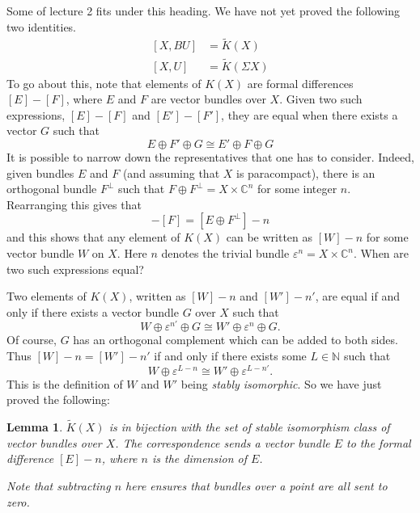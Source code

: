 \documentclass[a4paper,10pt]{article}
\theoremstyle{plain}%
\newtheorem{lem}[thm]{Lemma}
\theoremstyle{definition}
\theoremstyle{remark}
\newcommand{\NN}{\mathbb{N}}
\newcommand{\CC}{\mathbb{C}}
\renewcommand{\epsilon}{\varepsilon}
\newcommand{\eps}{\epsilon}
\begin{document}
Some of lecture 2 fits under this heading.
We have not yet proved the following two identities.
\begin{align}
  \label{xbu-is-kx} [X, BU] &= \tilde{K}(X)\\
  \label{xu-is-ksx}[X, U] &= \tilde{K}(\Sigma X)
\end{align}
To go about this, note that elements of $K(X)$ are formal differences
$[E]-[F]$, where $E$ and $F$ are vector bundles over $X$. Given two
such expressions, $[E]-[F]$ and $[E']-[F']$, they are equal when there
exists a vector $G$ such that
\begin{equation*}
  E\oplus F' \oplus G \cong E' \oplus F \oplus G
\end{equation*}
It is possible to narrow down the representatives that one has to
consider. Indeed, given bundles $E$ and $F$ (and assuming that $X$ is
paracompact), there is an orthogonal bundle $F^\perp$ such that
$F\oplus F^\perp = X \times \CC^n$ for some integer $n$. Rearranging
this gives that
\begin{equation*}
  [E]-[F] = [E\oplus F^\perp] - n
\end{equation*}
and this shows that any element of $K(X)$ can be written as $[W]-n$
for some vector bundle $W$ on $X$. Here $n$ denotes the trivial bundle
$\eps^n = X\times \CC^n$. When are two such expressions equal?

Two elements of $K(X)$, written as $[W]-n$ and $[W']-n'$, are equal if
and only if there exists a vector bundle $G$ over $X$ such that
\begin{equation*}
  W \oplus \eps^{n'} \oplus G \cong W' \oplus \eps^n \oplus G.
\end{equation*}
Of course, $G$ has an orthogonal complement which can be added to both
sides. Thus $[W]-n = [W']-n'$ if and only if there exists some $L\in
\NN$ such that
\begin{equation*}
  W \oplus \epsilon^{L-n} \cong W' \oplus \epsilon^{L-n'}.
\end{equation*}
This is the definition of $W$ and $W'$ being \emph{stably
  isomorphic}. So we have just proved the following:
\begin{lem}\label{kx-stableisos}
  $\tilde{K}(X)$ is in bijection with the set of stable isomorphism
  class of vector bundles over $X$. The correspondence sends a vector
  bundle $E$ to the formal difference $[E]-n$, where $n$ is the
  dimension of $E$.

  Note that subtracting $n$ here ensures that bundles over a point are
  all sent to zero.
\end{lem}
\end{document}

